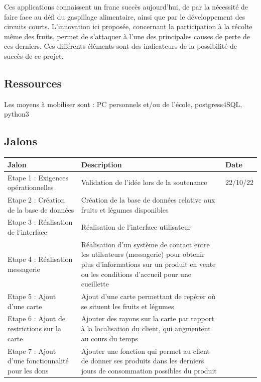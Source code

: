 \documentclass{article}
\begin{document}
Ces applications connaissent un franc succès aujourd'hui, de par la nécessité de faire face au défi du gaspillage alimentaire, ainsi que par le développement des circuits courts. L'innovation ici proposée, concernant la participation à la récolte même des fruits, permet de s'attaquer à l'une des principales causes de perte de ces derniers. Ces différents éléments sont des indicateurs de la possibilité de succès de ce projet.

\subsection{Ressources}
Les moyens à mobiliser sont :
PC personnels et/ou de l'école, postgress4SQL, python3 


\subsection{Jalons}
\begin{center}
\begin{tabular}{|p{3cm}|p{5cm}|p{2cm}|} 
  \hline
  Jalon & Description & Date \\
  \hline
  Etape 1 : Exigences opérationnelles & Validation de l'idée lors de la soutenance & 22/10/22 \\
  \hline
  Etape 2 : Création de la base de données & Création de la base de données relative aux fruits et légumes disponibles &  \\
  \hline
  Etape 3 : Réalisation de l'interface & Réalisation de l'interface utilisateur & \\
  \hline
  Etape 4 : Réalisation messagerie & 
  Réalisation d'un système de contact entre les utilsateurs (messagerie) pour obtenir plus d'informations sur un produit en vente ou les conditions d'accueil pour une cueillette & \\
  \hline
  Etape 5 : Ajout d'une carte & Ajout d'une carte permettant de repérer où se situent les fruits et légumes & \\
  \hline
  Etape 6 : Ajout de restrictions sur la carte & Ajouter des rayons sur la carte par rapport à la localisation du client, qui augmentent au cours du temps & \\
  \hline
  Etape 7 : Ajout d'une fonctionnalité pour les dons & Ajouter une fonction qui permet au client de donner ses produits dans les derniers jours de consommation possibles du produit & \\ 
  \hline
\end{tabular}
\end{center}
\end{document}
